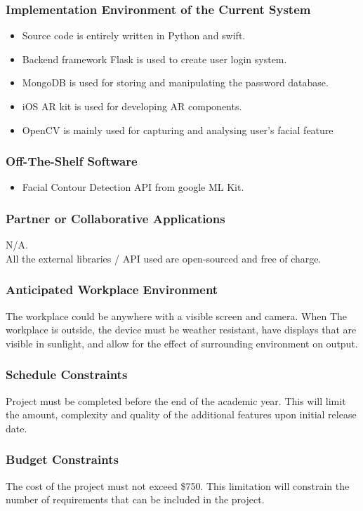 \documentclass[12pt]{article}
\begin{document}
\subsubsection{Implementation Environment of the Current System}
\begin{itemize}
    \item Source code is entirely written in Python and swift.
    \item Backend framework Flask is used to create user login system.
    \item MongoDB is used for storing and manipulating the password database.
    \item iOS AR kit is used for developing AR components.
    \item OpenCV is mainly used for capturing and analysing user's facial feature
\end{itemize}
\subsubsection{Off-The-Shelf Software}
\begin{itemize}
    \item Facial Contour Detection API from google ML Kit.
\end{itemize}
\subsubsection{Partner or Collaborative Applications}
N/A. \\All the external libraries / API used are open-sourced and free of charge.
\subsubsection{Anticipated Workplace Environment}
The workplace could be anywhere with a visible screen and camera. When The workplace is outside, the device must be weather resistant, have displays that are visible in sunlight, and allow for the effect of surrounding environment on output.
\subsubsection{Schedule Constraints}
Project must be completed before the end of the academic year. This will limit the amount, complexity and quality of the additional features upon initial release date.
\subsubsection{Budget Constraints}
The cost of the project must not exceed \$750. This limitation will constrain the number of requirements that can be included in the project.
\end{document}
